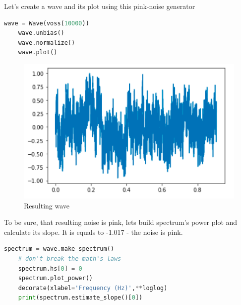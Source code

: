 \documentclass[a4paper]{article}
\begin{document}
            Let's create a wave and its plot using this pink-noise generator
            
            \begin{lstlisting}[language=Python,caption=Wave and plot creation,label={lst:part5_2}]
    wave = Wave(voss(10000))
    wave.unbias()
    wave.normalize()
    wave.plot()
            \end{lstlisting}
            
            \begin{figure}[H]
                \centering
                \includegraphics[width=\textwidth]{img/vvos.png}
                \caption{Resulting wave}
                \label{fig:part5_1}
            \end{figure}
            
            To be sure, that resulting noise is pink, lets build spectrum's power plot and calculate its slope. It is equals to -1.017 - the noise is pink.
            
            \begin{lstlisting}[language=Python,caption=Wave and plot creation,label={lst:part5_2}]
    spectrum = wave.make_spectrum()
    # don't break the math's laws
    spectrum.hs[0] = 0
    spectrum.plot_power()
    decorate(xlabel='Frequency (Hz)',**loglog)
    print(spectrum.estimate_slope()[0])
            \end{lstlisting}
            
\end{document}
